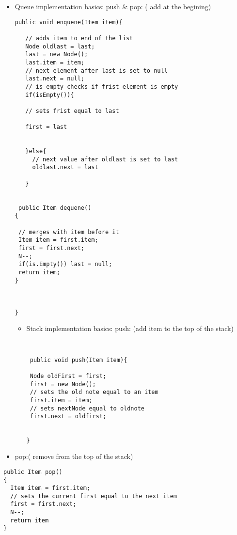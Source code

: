 \documentclass[11pt]{report}
\begin{document}
\begin{itemize}
\item Queue implementation basics:
push \& pop: ( add at the begining)
\begin{verbatim}
public void enquene(Item item){

   // adds item to end of the list
   Node oldlast = last;
   last = new Node();
   last.item = item;
   // next element after last is set to null
   last.next = null;
   // is empty checks if frist element is empty 
   if(isEmpty()){

   // sets frist equal to last 

   first = last


   }else{
     // next value after oldlast is set to last 
     oldlast.next = last

   }


 public Item dequene()
{

 // merges with item before it 
 Item item = first.item;
 first = first.next;
 N--;
 if(is.Empty()) last = null;
 return item;
}



}

\end{verbatim}

\begin{itemize}
\item Stack implementation basics:
push: (add item to the top of the stack)

\begin{verbatim}


 public void push(Item item){

 Node oldFirst = first;
 first = new Node();
 // sets the old note equal to an item
 first.item = item;
 // sets nextNode equal to oldnote
 first.next = oldfirst;


}
\end{verbatim}
\end{itemize}

\item pop:( remove from the top of the stack)
\end{itemize}


\begin{verbatim}
public Item pop()
{
  Item item = first.item;
  // sets the current first equal to the next item 
  first = first.next;
  N--;
  return item
}
\end{verbatim}
\end{document}
